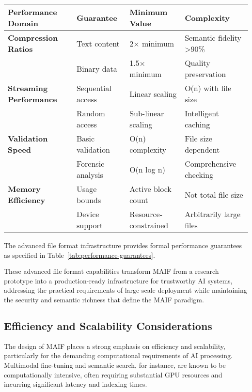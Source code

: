 \documentclass[conference]{IEEEtran}
\begin{document}
\begin{table*}[!t]
\renewcommand{\arraystretch}{1.3}
\caption{MAIF Formal Performance Guarantees and Complexity Analysis}
\label{tab:performance-guarantees}
\centering
\footnotesize
\begin{tabular}{p{3.5cm}p{4cm}p{3cm}p{3.5cm}}
\toprule
\textbf{Performance Domain} & \textbf{Guarantee} & \textbf{Minimum Value} & \textbf{Complexity} \\
\midrule
\textbf{Compression Ratios} & Text content & 2× minimum & Semantic fidelity >90\% \\
& Binary data & 1.5× minimum & Quality preservation \\
\midrule
\textbf{Streaming Performance} & Sequential access & Linear scaling & O(n) with file size \\
& Random access & Sub-linear scaling & Intelligent caching \\
\midrule
\textbf{Validation Speed} & Basic validation & O(n) complexity & File size dependent \\
& Forensic analysis & O(n log n) & Comprehensive checking \\
\midrule
\textbf{Memory Efficiency} & Usage bounds & Active block count & Not total file size \\
& Device support & Resource-constrained & Arbitrarily large files \\
\bottomrule
\end{tabular}
\end{table*}

The advanced file format infrastructure provides formal performance guarantees as specified in Table~\ref{tab:performance-guarantees}.

These advanced file format capabilities transform MAIF from a research prototype into a production-ready infrastructure for trustworthy AI systems, addressing the practical requirements of large-scale deployment while maintaining the security and semantic richness that define the MAIF paradigm.

\subsection{Efficiency and Scalability Considerations}

The design of MAIF places a strong emphasis on efficiency and scalability, particularly for the demanding computational requirements of AI processing. Multimodal fine-tuning and semantic search, for instance, are known to be computationally intensive, often requiring substantial GPU resources and incurring significant latency and indexing times\cite{ref79}.
\end{document}
